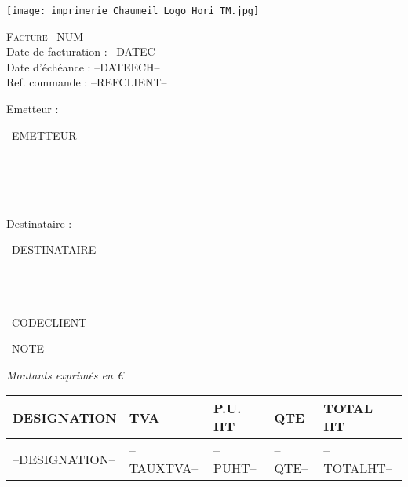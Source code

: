 \documentclass[a4paper, oneside, 10pt, french]{article}
\newcommand{\ghline}{\arrayrulecolor{gray}\hline\arrayrulecolor{black}}
\begin{document}
\begin{minipage}[t]{0.48\textwidth}
\texttt{[image: imprimerie\_Chaumeil\_Logo\_Hori\_TM.jpg]} 
\end{minipage}
\hspace{2mm}
\begin{minipage}[t]{0.48\textwidth}
\vspace{-40px}
\begin{flushright}
\textcolor{chaumeil-violet}{\textsc{\Large Facture --NUM--}}\\
Date de facturation : --DATEC--\\
Date d'échéance : --DATEECH--\\
{\small Ref. commande : --REFCLIENT--}\\
\end{flushright}
\end{minipage}

\begin{minipage}[t]{0.40\textwidth}
{\small Emetteur :}\\
\begin{fminipage}
{--EMETTEUR--}\\
\\
\\
\\
{\tiny \\}
\end{fminipage}
\end{minipage}
\hspace{1cm}
\begin{minipage}[t]{0.52\textwidth}
{\small Destinataire :}

\begin{fminipage}
{--DESTINATAIRE--}\\
\\
\\
\\
\begin{flushright}
{\tiny --CODECLIENT--}
\end{flushright}
\end{fminipage}
\end{minipage}

--NOTE--

\begin{flushright}
{\footnotesize \textit{Montants exprimés en €}}
\end{flushright}
\begin{tabular}{|p{8cm}|p{1.2cm}|p{1.8cm}|p{1.7cm}|p{3.1cm}|}
\ghline 
DESIGNATION & TVA & P.U. HT & QTE & TOTAL HT \\ 
\hline 
--DESIGNATION-- & --TAUXTVA-- & --PUHT-- & --QTE-- & --TOTALHT-- \\ 
\hline 
\end{tabular} 
\end{document}
